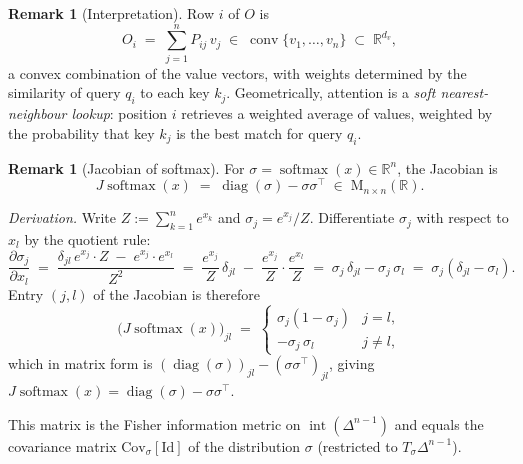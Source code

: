 \documentclass[11pt]{amsart}
\theoremstyle{plain}
\theoremstyle{definition}
\newtheorem{remark}[theorem]{Remark}
\newcommand{\R}{\mathbb{R}}
\newcommand{\Mat}[2]{\mathrm{M}_{#1 \times #2}(\R)}
\newcommand{\simplex}[1]{\Delta^{#1}}   %
\newcommand{\softmax}{\operatorname{softmax}}
\newcommand{\diag}{\operatorname{diag}}
\begin{document}
\begin{remark}[Interpretation]
Row $i$ of $O$ is
\[
    O_i \;=\; \sum_{j=1}^n P_{ij}\, v_j
    \;\in\; \operatorname{conv}\{v_1,\ldots,v_n\} \;\subset\; \R^{d_v},
\]
a convex combination of the value vectors, with weights determined by the
similarity of query $q_i$ to each key $k_j$.  Geometrically, attention is a
\emph{soft nearest-neighbour lookup}: position $i$ retrieves a weighted average
of values, weighted by the probability that key $k_j$ is the best match for
query $q_i$.
\end{remark}

\begin{remark}[Jacobian of softmax]
\label{rem:jsoftmax}
For $\sigma = \softmax(x) \in \R^n$, the Jacobian is
\[
    J\softmax(x) \;=\; \diag(\sigma) - \sigma\sigma^\top \;\in\; \Mat{n}{n}.
\]

\textit{Derivation.}  Write $Z := \sum_{k=1}^n e^{x_k}$ and $\sigma_j = e^{x_j}/Z$.
Differentiate $\sigma_j$ with respect to $x_l$ by the quotient rule:
\[
    \frac{\partial \sigma_j}{\partial x_l}
    \;=\; \frac{\delta_{jl}\,e^{x_j}\cdot Z \;-\; e^{x_j}\cdot e^{x_l}}{Z^2}
    \;=\; \frac{e^{x_j}}{Z}\,\delta_{jl}
          \;-\; \frac{e^{x_j}}{Z}\cdot\frac{e^{x_l}}{Z}
    \;=\; \sigma_j\,\delta_{jl} - \sigma_j\,\sigma_l
    \;=\; \sigma_j(\delta_{jl} - \sigma_l).
\]
Entry $(j,l)$ of the Jacobian is therefore
\[
    \bigl(J\softmax(x)\bigr)_{jl}
    \;=\; \begin{cases}
        \sigma_j(1-\sigma_j) & j=l, \\
        -\sigma_j\,\sigma_l  & j\neq l,
    \end{cases}
\]
which in matrix form is $(\diag(\sigma))_{jl} - (\sigma\sigma^\top)_{jl}$, giving
$J\softmax(x) = \diag(\sigma) - \sigma\sigma^\top$.

This matrix is the Fisher information metric on
$\operatorname{int}(\simplex{n-1})$ and equals the covariance matrix
$\mathrm{Cov}_\sigma[\mathrm{Id}]$ of the distribution $\sigma$
(restricted to $T_\sigma\simplex{n-1}$).
\end{remark}
\end{document}
